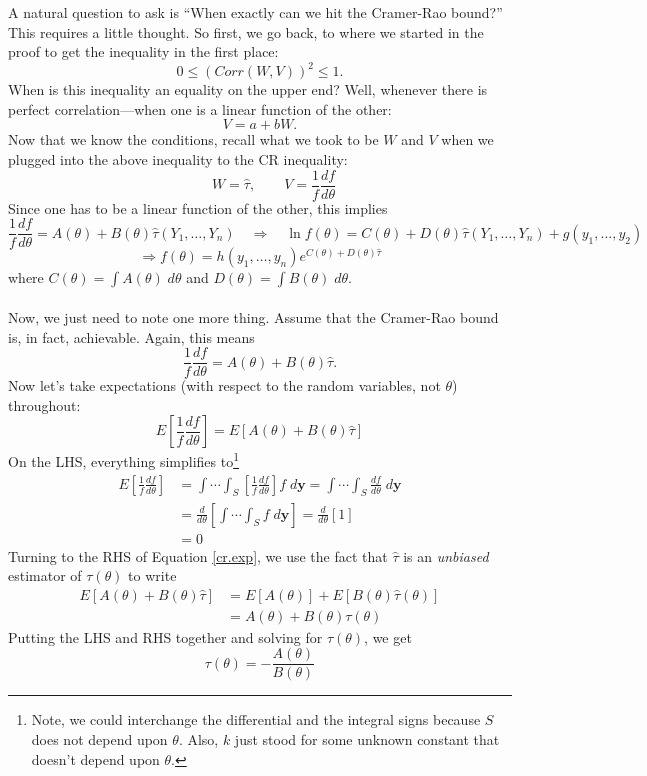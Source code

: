 \documentclass[a4paper,12pt]{scrartcl}
\begin{document}
A natural question to ask is ``When exactly can we hit the 
Cramer-Rao bound?'' This requires a little thought.  So first, we 
go back, to where we started in the proof to get the inequality
in the first place:
   \[ 0 \leq (Corr(W,V))^2 \leq 1.\]
When is this inequality an equality on the upper end? Well, whenever
there is perfect correlation---when one is a linear function of the
other:
   \[ V = a + bW.\]
Now that we know the conditions, recall what we took to be $W$ and
$V$ when we plugged into the above inequality to the CR inequality:
   \[ \qquad W = \hat{\tau}, \qquad V = \frac{1}{f} \frac{df}{d\theta}
      \]
Since one has to be a linear function of the other, this implies
   \[ \frac{1}{f} \frac{df}{d\theta} = A(\theta) + B(\theta) 
      \hat{\tau}(Y_1,\ldots,Y_n) \quad
      \Rightarrow \quad \ln f(\theta) = C(\theta) + D(\theta) 
      \hat{\tau}(Y_1,\ldots,Y_n) + g(y_1, \ldots, y_2)  \]
\begin{equation}
   \label{cr.form}
    \Rightarrow f(\theta) = h(y_1, \ldots, y_n) e^{C(\theta)  
      + D(\theta)  \hat{\tau}} 
   \end{equation}
where $C(\theta) = \int A(\theta) \; d\theta$ and $D(\theta) = 
\int B(\theta) \; d\theta$.
\\
\\
Now, we just need to note one more thing. Assume that the Cramer-Rao
bound is, in fact, achievable. Again, this means
   \[ \frac{1}{f} \frac{df}{d\theta} = A(\theta) + B(\theta) 
      \hat{\tau}.\]
Now let's take expectations (with respect to the random variables, not
$\theta$) throughout:
\begin{equation}
   \label{cr.exp}
    E\left[\frac{1}{f} \frac{df}{d\theta}\right] = E
      \left[A(\theta) + B(\theta) \hat{\tau}\right]
\end{equation}
On the LHS, everything simplifies to\footnote{
   Note, we could interchange the differential and the integral signs 
because $S$ does not depend upon $\theta$. Also, $k$ just stood for
some unknown constant that doesn't depend upon $\theta$.}
   \begin{align*} 
      E\left[\frac{1}{f} \frac{df}{d\theta}\right] &= 
      \int \cdots \int_S \left[\frac{1}{f} \frac{df}{d\theta}\right] f
      \; d\mathbf{y} =  
      \int \cdots \int_S \frac{df}{d\theta}
      \; d\mathbf{y} \\
      &= \frac{d}{d\theta}\left[\int \cdots \int_S f
      \; d\mathbf{y} \right]
      = \frac{d}{d\theta} \left[1 \right]\\
      &= 0
   \end{align*}
Turning to the RHS of Equation \ref{cr.exp}, we use the fact that
$\hat{\tau}$ is an \emph{unbiased} estimator of $\tau(\theta)$ to write
\begin{align*} 
     E\left[A(\theta) + B(\theta) \hat{\tau}\right] &= 
     E[ A(\theta) ] + E\left[B(\theta) \hat{\tau}(\theta)\right] \\
     &= A(\theta) + B(\theta) \tau(\theta) 
\end{align*}
Putting the LHS and RHS together and solving for $\tau(\theta)$, we get
\begin{equation}
   \label{cr.tau}
   \tau(\theta) = -\frac{A(\theta)}{B(\theta)}
\end{equation}
\end{document}
